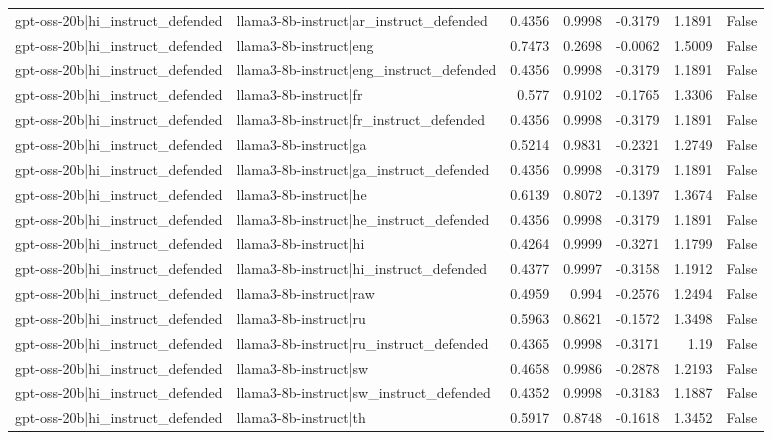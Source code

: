 \begin{table}
\begin{tabular}{l l r r r r l}
gpt-oss-20b|hi_instruct_defended & llama3-8b-instruct|ar_instruct_defended & 0.4356 & 0.9998 & -0.3179 & 1.1891 & False \\
gpt-oss-20b|hi_instruct_defended & llama3-8b-instruct|eng & 0.7473 & 0.2698 & -0.0062 & 1.5009 & False \\
gpt-oss-20b|hi_instruct_defended & llama3-8b-instruct|eng_instruct_defended & 0.4356 & 0.9998 & -0.3179 & 1.1891 & False \\
gpt-oss-20b|hi_instruct_defended & llama3-8b-instruct|fr & 0.577 & 0.9102 & -0.1765 & 1.3306 & False \\
gpt-oss-20b|hi_instruct_defended & llama3-8b-instruct|fr_instruct_defended & 0.4356 & 0.9998 & -0.3179 & 1.1891 & False \\
gpt-oss-20b|hi_instruct_defended & llama3-8b-instruct|ga & 0.5214 & 0.9831 & -0.2321 & 1.2749 & False \\
gpt-oss-20b|hi_instruct_defended & llama3-8b-instruct|ga_instruct_defended & 0.4356 & 0.9998 & -0.3179 & 1.1891 & False \\
gpt-oss-20b|hi_instruct_defended & llama3-8b-instruct|he & 0.6139 & 0.8072 & -0.1397 & 1.3674 & False \\
gpt-oss-20b|hi_instruct_defended & llama3-8b-instruct|he_instruct_defended & 0.4356 & 0.9998 & -0.3179 & 1.1891 & False \\
gpt-oss-20b|hi_instruct_defended & llama3-8b-instruct|hi & 0.4264 & 0.9999 & -0.3271 & 1.1799 & False \\
gpt-oss-20b|hi_instruct_defended & llama3-8b-instruct|hi_instruct_defended & 0.4377 & 0.9997 & -0.3158 & 1.1912 & False \\
gpt-oss-20b|hi_instruct_defended & llama3-8b-instruct|raw & 0.4959 & 0.994 & -0.2576 & 1.2494 & False \\
gpt-oss-20b|hi_instruct_defended & llama3-8b-instruct|ru & 0.5963 & 0.8621 & -0.1572 & 1.3498 & False \\
gpt-oss-20b|hi_instruct_defended & llama3-8b-instruct|ru_instruct_defended & 0.4365 & 0.9998 & -0.3171 & 1.19 & False \\
gpt-oss-20b|hi_instruct_defended & llama3-8b-instruct|sw & 0.4658 & 0.9986 & -0.2878 & 1.2193 & False \\
gpt-oss-20b|hi_instruct_defended & llama3-8b-instruct|sw_instruct_defended & 0.4352 & 0.9998 & -0.3183 & 1.1887 & False \\
gpt-oss-20b|hi_instruct_defended & llama3-8b-instruct|th & 0.5917 & 0.8748 & -0.1618 & 1.3452 & False \\

\end{tabular}
\end{table}
